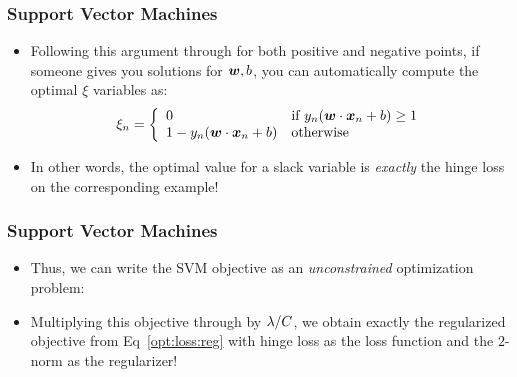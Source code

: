 \documentclass[trans]{beamer}
\begin{document}
\begin{frame}
  \frametitle{Support Vector Machines}
\begin{itemize}
\item 
Following this argument through for both positive and negative points,
if someone gives you solutions for ${\boldsymbol{w}},b$, you can automatically
compute the optimal $\xi$ variables as:
%
\begin{equation}
  \xi_n = \left\{\begin{array}{ll}
    0 & \text{if } y_n({\boldsymbol{w}} \cdot {\boldsymbol{x}}_n+b) \geq 1 \\
    1 - y_n({\boldsymbol{w}} \cdot {\boldsymbol{x}}_n+b) & \text{otherwise}\end{array}\right.
\end{equation}
%
\item In other words, the optimal value for a slack variable is
\emph{exactly} the hinge loss on the corresponding example!  
\end{itemize}
\end{frame}
\begin{frame}
  \frametitle{Support Vector Machines}
\begin{itemize}
\item 
Thus, we
can write the SVM objective as an \emph{unconstrained} optimization
problem:
%
%
\item Multiplying this objective through by $\lambda/C$, we obtain exactly the
regularized objective from Eq~\eqref{opt:loss:reg} with hinge loss as
the loss function and the $2$-norm as the regularizer!
\end{itemize}
\end{frame}


%
%
%
\end{document}
